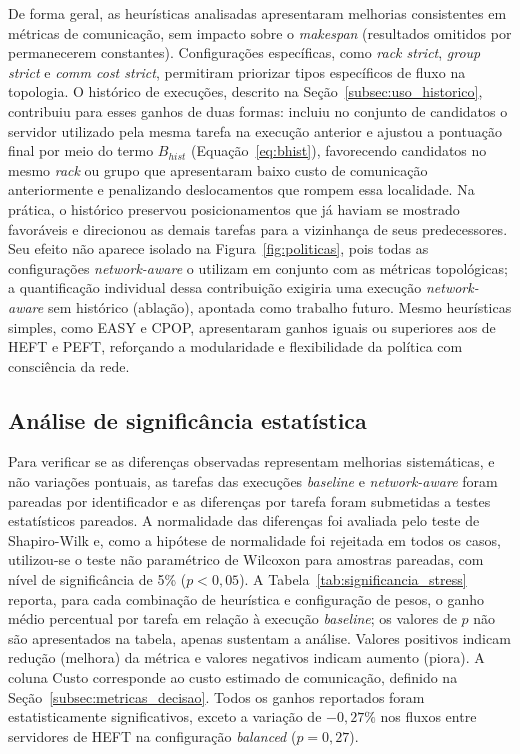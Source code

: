 \documentclass[12pt]{article}
\begin{document}
De forma geral, as heurísticas analisadas apresentaram melhorias consistentes em métricas de comunicação, sem impacto sobre o \textit{makespan} (resultados omitidos por permanecerem constantes). 
%
Configurações específicas, como \textit{rack strict}, \textit{group strict} e \textit{comm cost strict}, permitiram priorizar tipos específicos de fluxo na topologia.
%
O histórico de execuções, descrito na Seção~\ref{subsec:uso_historico}, contribuiu para esses ganhos de duas formas: incluiu no conjunto de candidatos o servidor utilizado pela mesma tarefa na execução anterior e ajustou a pontuação final por meio do termo $B_{hist}$ (Equação~\ref{eq:bhist}), favorecendo candidatos no mesmo \textit{rack} ou grupo que apresentaram baixo custo de comunicação anteriormente e penalizando deslocamentos que rompem essa localidade.
%
Na prática, o histórico preservou posicionamentos que já haviam se mostrado favoráveis e direcionou as demais tarefas para a vizinhança de seus predecessores. Seu efeito não aparece isolado na Figura~\ref{fig:politicas}, pois todas as configurações \textit{network-aware} o utilizam em conjunto com as métricas topológicas; a quantificação individual dessa contribuição exigiria uma execução \textit{network-aware} sem histórico (ablação), apontada como trabalho futuro.
%
%
Mesmo heurísticas simples, como EASY e CPOP, apresentaram ganhos iguais ou superiores aos de HEFT e PEFT, reforçando a modularidade e flexibilidade da política com consciência da rede.

\subsection{Análise de significância estatística}
\label{sec:significancia_estatistica}

Para verificar se as diferenças observadas representam melhorias sistemáticas, e não variações pontuais, as tarefas das execuções \textit{baseline} e \textit{network-aware} foram pareadas por identificador e as diferenças por tarefa foram submetidas a testes estatísticos pareados.
%
A normalidade das diferenças foi avaliada pelo teste de Shapiro-Wilk e, como a hipótese de normalidade foi rejeitada em todos os casos, utilizou-se o teste não paramétrico de Wilcoxon para amostras pareadas, com nível de significância de 5\% ($p < 0{,}05$).
%
A Tabela~\ref{tab:significancia_stress} reporta, para cada combinação de heurística e configuração de pesos, o ganho médio percentual por tarefa em relação à execução \textit{baseline}; os valores de $p$ não são apresentados na tabela, apenas sustentam a análise.
%
Valores positivos indicam redução (melhora) da métrica e valores negativos indicam aumento (piora). A coluna Custo corresponde ao custo estimado de comunicação, definido na Seção~\ref{subsec:metricas_decisao}.
%
Todos os ganhos reportados foram estatisticamente significativos, exceto a variação de $-0{,}27\%$ nos fluxos entre servidores de HEFT na configuração \textit{balanced} ($p = 0{,}27$).
\end{document}
